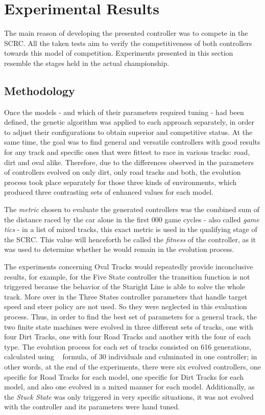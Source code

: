 \section{Experimental Results} \label{sec:Experiments}

	The main reason of developing the presented controller was to compete in the SCRC. All the taken tests aim to verify the competitiveness of both controllers towards this model of competition. Experiments presented in this section resemble the stages held in the actual championship.
\subsection{Methodology} \label{subsec:Methodology}

	Once the models - and which of their parameters required tuning - had been defined, the genetic algorithm was applied to each approach separately, in order to adjust their configurations to obtain superior and competitive status. At the same time, the goal was to find general and versatile controllers with good results for any track and specific ones that were fittest to race in various tracks: road, dirt and oval alike. Therefore, due to the differences observed in the parameters of controllers evolved on only dirt, only road tracks and both, the evolution process took place separately for those three kinds of environments, which produced three contrasting sets of enhanced values for each model.
	
	The \emph{metric} chosen to evaluate the generated controllers was the combined sum of the distance raced by the car alone in the first  000 game cycles - also called \emph{game tics} - in a list of mixed tracks, this exact metric is used in the qualifying stage of the SCRC. This value will henceforth be called the \emph{fitness} of the controller, as it was used to determine whether he would remain in the evolution process.
	
	The experiments concerning Oval Tracks would repeatedly provide
	inconclusive results, for example, for the Five State controller the
	transition function is not triggered because the behavior of the Staright Line is able to solve the whole track. More over
	in the Three States controller parameters that handle target speed and steer policy are not used.
	So they were neglected in this evaluation process. Thus, in order to find the best set of parameters for a general track, the two finite state machines were evolved in three different sets of tracks, one with four Dirt Tracks, one with four Road Tracks and another with the four of each type. The evolution process for each set of tracks consisted on 616 generations, calculated using ~\cite{218485} formula, of 30 individuals and culminated in one controller; in other words, at the end of the experiments, there were six evolved controllers, one specific for Road Tracks for each model, one specific for Dirt Tracks for each model, and also one evolved in a mixed manner for each model. Additionally, as the \emph{Stuck State} was only triggered in very specific situations, it was not evolved with the controller and its parameters were hand tuned.
	
